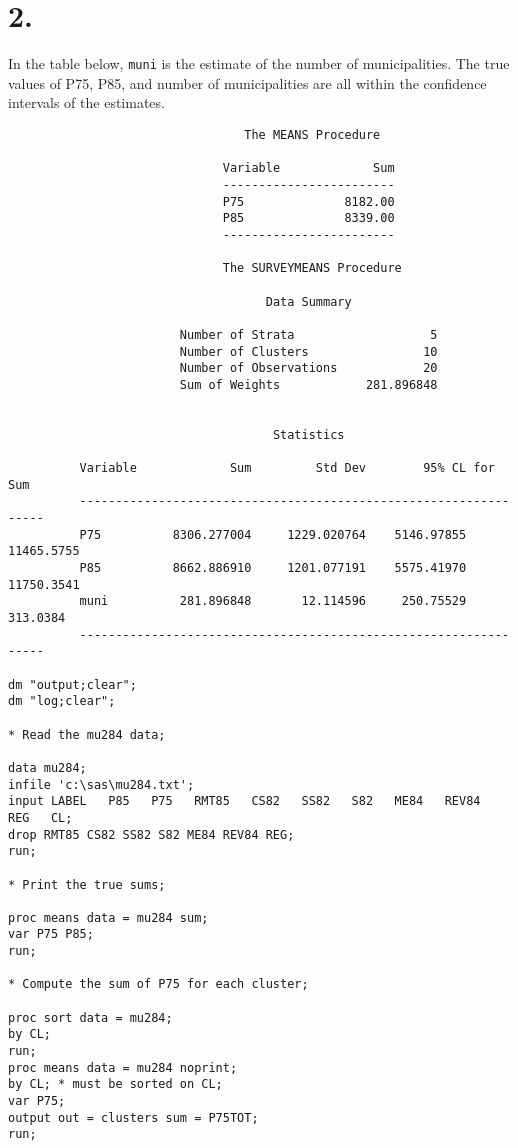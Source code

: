 \documentclass[12pt]{article}
\begin{document}
\section*{2.}
In the table below, {\tt muni} is the estimate of the number of municipalities.
The true values of P75, P85, and number of municipalities are all within the
confidence intervals of the estimates.
\begin{verbatim}
                                 The MEANS Procedure

                              Variable             Sum
                              ------------------------
                              P75              8182.00
                              P85              8339.00
                              ------------------------

                              The SURVEYMEANS Procedure

                                    Data Summary

                        Number of Strata                   5
                        Number of Clusters                10
                        Number of Observations            20
                        Sum of Weights            281.896848


                                     Statistics

          Variable             Sum         Std Dev        95% CL for Sum
          -----------------------------------------------------------------
          P75          8306.277004     1229.020764    5146.97855 11465.5755
          P85          8662.886910     1201.077191    5575.41970 11750.3541
          muni          281.896848       12.114596     250.75529   313.0384
          -----------------------------------------------------------------

dm "output;clear";
dm "log;clear";

* Read the mu284 data;

data mu284;
infile 'c:\sas\mu284.txt';
input LABEL   P85   P75   RMT85   CS82   SS82   S82   ME84   REV84   REG   CL;
drop RMT85 CS82 SS82 S82 ME84 REV84 REG;
run;

* Print the true sums;

proc means data = mu284 sum;
var P75 P85;
run;

* Compute the sum of P75 for each cluster;

proc sort data = mu284;
by CL;
run;
proc means data = mu284 noprint;
by CL; * must be sorted on CL;
var P75;
output out = clusters sum = P75TOT;
run;


\end{verbatim}
\end{document}

